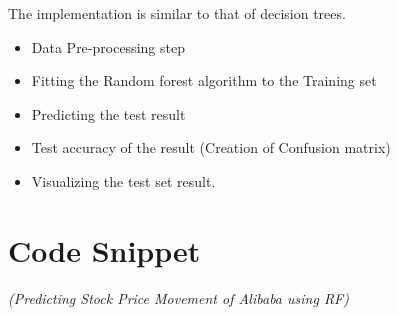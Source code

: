 \documentclass[12pt,a4paper]{report}
\begin{document}
The implementation is similar to that of decision trees.
\begin{itemize}
\item Data Pre-processing step
\item Fitting the Random forest algorithm to the Training set
\item Predicting the test result
\item Test accuracy of the result (Creation of Confusion matrix)
\item Visualizing the test set result.
\end{itemize}

\section{Code Snippet} \textit{(Predicting Stock Price Movement of Alibaba using RF)}
\end{document}
